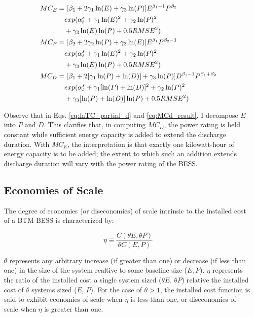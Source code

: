 \begin{subequations}\label{eq:MC_results}
\begin{align}
    MC_{E} =&~[\beta_1 + 2 \gamma_1 \ln(E) + \gamma_3 \ln(P)] E^{\beta_1-1} P^{\beta_2}  \label{eq:MCe_result} \\ & exp(\alpha^{s}_{t} + \gamma_1 \ln(E)^2 + \gamma_2 \ln(P)^2 \notag \\
    & + \gamma_3 \ln(E) \ln(P) + 0.5 RMSE^2) \notag \\
    MC_{P} =&~[\beta_2 + 2 \gamma_2 \ln(P) + \gamma_3 \ln(E)] E^{\beta_1} P^{\beta_2-1}  \label{eq:MCp_result} \\ & exp(\alpha^{s}_{t} + \gamma_1 \ln(E)^2 + \gamma_2 \ln(P)^2 \notag \\
    & + \gamma_3 \ln(E) \ln(P) + 0.5 RMSE^2) \notag \\
    MC_{D}  =&~[\beta_1 + 2 [\gamma_1 \ln(P) + \ln(D)] + \gamma_3 \ln(P)] D^{\beta_1-1} P^{\beta_1+\beta_2}  \label{eq:MCd_result} \\ & exp(\alpha^{s}_{t} + \gamma_1 [\ln(P)+\ln(D)]^2 + \gamma_2 \ln(P)^2 \notag \\
    & + \gamma_3 [\ln(P)+\ln(D)] \ln(P) + 0.5 RMSE^2) \notag 
\end{align}
\end{subequations}

Observe that in Eqs. \ref{eq:lnTC_partial_d} and \ref{eq:MCd_result}, I decompose $E$ into $P$ and $D$. This clarifies that, in computing $MC_D$, the power rating is held constant while sufficient energy capacity is added to extend the discharge duration. With $MC_E$, the interpretation is that exactly one kilowatt-hour of energy capacity is to be added; the extent to which such an addition extends discharge duration will vary with the power rating of the BESS.

\subsection{Economies of Scale}\label{apdx:eos_derivation}

The degree of economies (or diseconomies) of scale intrinsic to the installed cost of a BTM BESS is characterized by:

\begin{equation}\label{eq:eos_def}
    \eta \equiv \frac{C(\theta E, \theta P)}{\theta C(E, P)}
\end{equation}

$\theta$ represents any arbitrary increase (if greater than one) or decrease (if less than one) in the size of the system realtive to some baseline size ($E, P$). $\eta$ represents the ratio of the installed cost a single system sized ($\theta E$, $\theta P$) relative the installed cost of $\theta$ systems sized ($E$, $P$). For the case of $\theta >1$, the installed cost function is said to exhibit economies of scale when $\eta$ is less than one, or diseconomies of scale when $\eta$ is greater than one.

